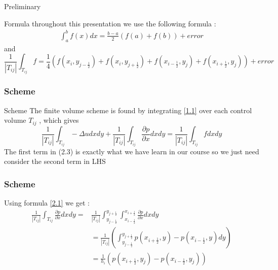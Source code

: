 \documentclass[11pt]{beamer}
\numberwithin{equation}{section}
\theoremstyle{plain}
\theoremstyle{definition}
\theoremstyle{remark}
\begin{document}
\begin{frame}{Preliminary}
\begin{block}{Formula}
throughout this presentation we use the following formula : 
\begin{align}
\int_a^bf(x)dx=\frac{b-a}{2}(f(a)+f(b)) + error \label{2.1}
\end{align}
and 
\begin{equation*}
\frac{1}{|T_{ij}|}\int_{T_{ij}}f=\frac{1}{4}\left ( f(x_i,y_{j-\frac{1}{2}})+f(x_i,y_{j+\frac{1}{2}})+f(x_{i-\frac{1}{2}},y_{j})+f(x_{i+\frac{1}{2}},y_{j})  \right ) +error
\end{equation*}
\end{block}
\end{frame}

\begin{frame}\frametitle{Scheme}
\begin{block}{Scheme}
The finite volume scheme is found by integrating \ref{1.1} over each control volume $T_{ij}$ , which gives
\begin{equation}
\frac{1}{|T_{ij}|}\int_{T_{ij}}-\Delta udxdy+\frac{1}{|T_{ij}|}\int_{T_{ij}} \frac{\partial p}{\partial x}dxdy=\frac{1}{|T_{ij}|}\int_{T_{ij}} fdxdy 
\end{equation}
The first term in (2.3) is exactly what we have learn in our course so we just need consider the second term in LHS
\end{block}
\end{frame}
\begin{frame}\frametitle{Scheme}
Using formula \ref{2.1} we get : 
\begin{align*}
\frac{1}{|T_{ij}|}\int_{T_{ij}} \frac{\partial p}{\partial x}dxdy =& \frac{1}{|T_{ij}|} \int_{y_{j-\frac{1}{2}}}^{y_{j+\frac{1}{2}}} \int_{x_{i-\frac{1}{2}}}^{x_{i+\frac{1}{2}}} \frac{\partial p}{\partial x}dxdy  \\
&= \frac{1}{|T_{ij}|} \left ( \int_{y_{j-\frac{1}{2}}}^{y_{j+\frac{1}{2}}} p(x_{i+\frac{1}{2}},y)-p(x_{i-\frac{1}{2}},y)dy \right ) \\
& = \frac{1}{h_{i}} \left(p(x_{i+\frac{1}{2}},y_{j})-p(x_{i-\frac{1}{2}},y_{j})\right) 
\end{align*}
\end{frame}
\end{document}
